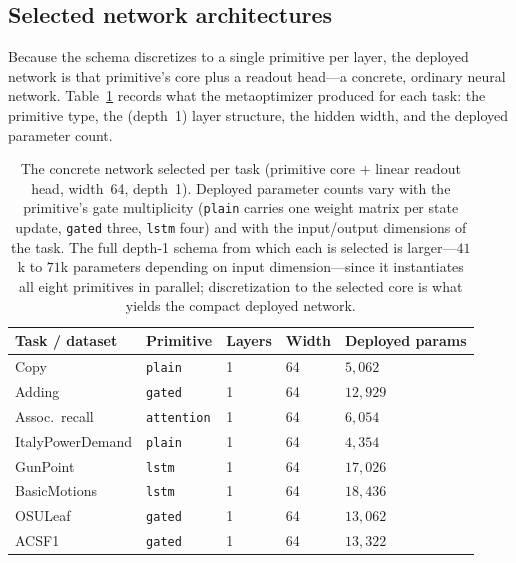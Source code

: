 \documentclass[11pt]{article}
\newcommand{\allowbreakhere}{\discretionary{}{}{}}
\newcommand{\code}[1]{\texttt{\def\_{\char`_\allowbreakhere}#1}}
\begin{document}
\subsection{Selected network architectures}
\label{sec:architectures}

Because the schema discretizes to a single primitive per layer, the deployed network is
that primitive's core plus a readout head---a concrete, ordinary neural network. Table~\ref{tab:deployed} records what the metaoptimizer produced for each task: the primitive type, the
(depth~1) layer structure, the hidden width, and the deployed parameter count.

\begin{table}[h]
\centering
\small
\renewcommand{\arraystretch}{1.2}
\begin{tabular}{p{3.4cm} p{2.2cm} p{1.4cm} p{1.4cm} p{2.4cm}}
\toprule
\textbf{Task / dataset} & \textbf{Primitive} & \textbf{Layers} & \textbf{Width} & \textbf{Deployed params}\\
\midrule
Copy             & \code{plain}     & 1 & 64 & $5{,}062$\\
Adding           & \code{gated}     & 1 & 64 & $12{,}929$\\
Assoc.\ recall   & \code{attention} & 1 & 64 & $6{,}054$\\
ItalyPowerDemand & \code{plain}     & 1 & 64 & $4{,}354$\\
GunPoint         & \code{lstm}      & 1 & 64 & $17{,}026$\\
BasicMotions     & \code{lstm}      & 1 & 64 & $18{,}436$\\
OSULeaf          & \code{gated}     & 1 & 64 & $13{,}062$\\
ACSF1            & \code{gated}     & 1 & 64 & $13{,}322$\\
\bottomrule
\end{tabular}
\caption{The concrete network selected per task (primitive core $+$ linear readout head,
width~64, depth~1). Deployed parameter counts vary with the primitive's gate multiplicity
(\code{plain} carries one weight matrix per state update, \code{gated} three, \code{lstm}
four) and with the input/output dimensions of the task. The full depth-1 schema from which
each is selected is larger---$41$k to $71$k parameters depending on input dimension---since it
instantiates all eight primitives in parallel; discretization to the selected core is what
yields the compact deployed network.}
\label{tab:deployed}
\end{table}
\end{document}
